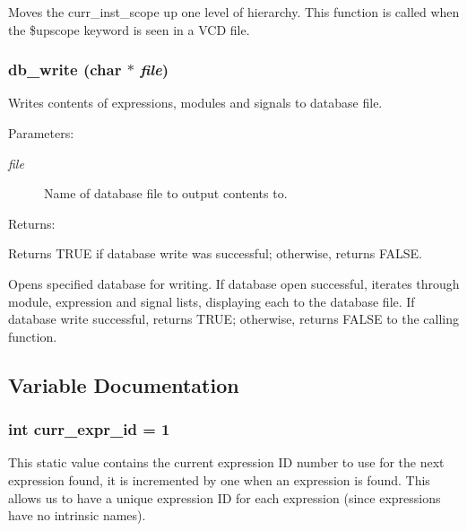 Moves the curr\_\-inst\_\-scope up one level of hierarchy. This function is called when the \$upscope keyword is seen in a VCD file. 
\subsubsection{ db\_\-write (char $\ast$ {\em file})}\label{db_8c_a15}


Writes contents of expressions, modules and signals to database file.

\begin{Desc}
\item[Parameters: ]\par
\begin{description}
\item[{\em 
file}]Name of database file to output contents to.\end{description}
\end{Desc}
\begin{Desc}
\item[Returns: ]\par
Returns TRUE if database write was successful; otherwise, returns FALSE.\end{Desc}
Opens specified database for writing. If database open successful, iterates through module, expression and signal lists, displaying each to the database file. If database write successful, returns TRUE; otherwise, returns FALSE to the calling function. 

\subsection{Variable Documentation}
\subsubsection{\setlength{\rightskip}{0pt plus 5cm}int curr\_\-expr\_\-id = 1}\label{db_8c_a13}


This static value contains the current expression ID number to use for the next expression found, it is incremented by one when an expression is found. This allows us to have a unique expression ID for each expression (since expressions have no intrinsic names). 
